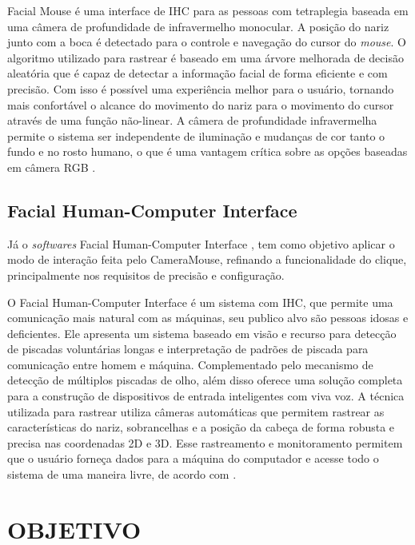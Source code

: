 Facial Mouse é uma interface de IHC para as pessoas com tetraplegia baseada em uma câmera de profundidade de infravermelho monocular. A posição do nariz junto com a boca é detectado para o controle e navegação do cursor do \textit{mouse}. O algoritmo utilizado para rastrear é baseado em uma árvore melhorada de decisão aleatória que é capaz de detectar a informação facial de forma eficiente e com precisão. Com isso é possível uma experiência melhor para o usuário, tornando mais confortável o alcance do movimento do nariz para o movimento do cursor através de uma função não-linear. A câmera de profundidade infravermelha permite o sistema ser independente de iluminação e mudanças de cor tanto o fundo e no rosto humano, o que é uma vantagem crítica sobre as opções baseadas em câmera RGB .

\subsection{Facial Human-Computer Interface}

Já o \textit{softwares} Facial Human-Computer Interface , tem como objetivo aplicar o modo de interação feita pelo CameraMouse, refinando a funcionalidade do clique, principalmente nos requisitos de precisão e configuração.

O Facial Human-Computer Interface é um sistema com IHC, que permite uma comunicação mais natural com as máquinas, seu publico alvo são pessoas idosas e deficientes. Ele apresenta um sistema baseado em visão e recurso para detecção de piscadas voluntárias longas e interpretação de padrões de piscada para comunicação entre homem e máquina. Complementado pelo mecanismo de detecção de múltiplos piscadas de olho, além disso oferece uma solução completa para a construção de dispositivos de entrada inteligentes com viva voz. A técnica utilizada para rastrear utiliza câmeras automáticas que permitem rastrear as características do nariz, sobrancelhas e a posição da cabeça de forma robusta e precisa nas coordenadas 2D e 3D. Esse rastreamento e monitoramento permitem que o usuário forneça dados para a máquina do computador e acesse todo o sistema de uma maneira livre, de acordo com . 


\section{OBJETIVO}\label{sub:objeto}

